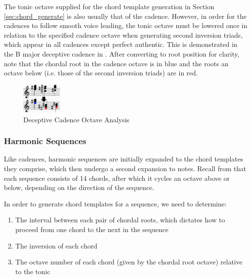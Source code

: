 \documentclass{article}
\begin{document}
The tonic octave supplied for the chord template generation in Section \ref{sec:chord_generate} is also usually that of the cadence. However, in order for the cadences to follow smooth voice leading, the tonic octave must be lowered once in relation to the specified cadence octave when generating second inversion triads, which appear in all cadences except perfect authentic. This is demonstrated in the B major deceptive cadence in . After converting to root position for clarity, note that the chordal root in the cadence octave is in blue and the roots an octave below (i.e. those of the second inversion triads) are in red.

\vspace{-2mm}
\begin{figure}[h!]
\centering
\includegraphics[width=0.18\textwidth]{images/cadence_octaves}
  \caption{Deceptive Cadence Octave Analysis}\label{fig:cadence_octaves}
\end{figure}
\vspace{-4mm}

\subsubsection{Harmonic Sequences}
Like cadences, harmonic sequences are initially expanded to the chord templates they comprise, which then undergo a second expansion to notes. Recall from  that each sequence consists of 14 chords, after which it cycles an octave above or below, depending on the direction of the sequence.

In order to generate chord templates for a sequence, we need to determine:

\vspace{-1mm}
\begin{enumerate}
\itemsep0em 
\item The interval between each pair of chordal roots, which dictates how to proceed from one chord to the next in the sequence
\item The inversion of each chord
\item The octave number of each chord (given by the chordal root octave) relative to the tonic
\end{enumerate}
\end{document}
